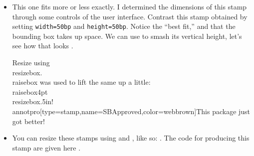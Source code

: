 \documentclass[12pt]{article}
\begin{document}
\begin{itemize}
\begin{itemize}
        \item This one
            {\previewOn{}} fits more or less exactly\annotpro[margin,readonly,margintext={\centering Good Fit}]{\annotstampi}.  I
            determined the dimensions of this stamp through some controls
            of the user interface. Contrast this stamp
            {\previewOn{}}\annotpro[margin,readonly,margintext={\centering Bad Fit}]{\annotstampii} obtained by setting
            \texttt{width=50bp} and \texttt{height=50bp}. Notice the
            ``best fit,'' and that the bounding box takes up space. We
            can use  to smash its vertical height, let's see
            how that looks
            {\previewOn{}}.

\smallskip


\goodbreak

\previewOff


\begin{defineJS}{\annotstampiii}
Resize using \\resizebox. \\raisebox was used to lift the same up a little:
\\raisebox{4pt}{\\resizebox{.5in}{!}{\\annotpro[type=stamp,name=SBApproved,color=webbrown]{This package just got better!}}}
\end{defineJS}

    \item[] You can resize these stamps using  and , like so:
    .
    The code for producing this stamp are given here \annotpro{\annotstampiii}.

\begin{defineJS}{\annotstampiv}
\end{defineJS}


\end{itemize}
\end{itemize}
\end{document}
